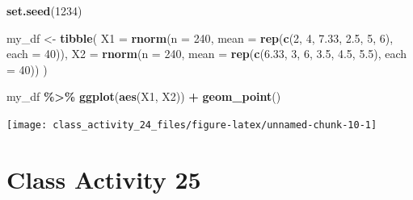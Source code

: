 \documentclass[
]{book}
\newenvironment{Shaded}{\begin{snugshade}}{\end{snugshade}}
\newcommand{\AttributeTok}[1]{\textcolor[rgb]{0.13,0.29,0.53}{#1}}
\newcommand{\DecValTok}[1]{\textcolor[rgb]{0.00,0.00,0.81}{#1}}
\newcommand{\FloatTok}[1]{\textcolor[rgb]{0.00,0.00,0.81}{#1}}
\newcommand{\FunctionTok}[1]{\textcolor[rgb]{0.13,0.29,0.53}{\textbf{#1}}}
\newcommand{\NormalTok}[1]{#1}
\newcommand{\OtherTok}[1]{\textcolor[rgb]{0.56,0.35,0.01}{#1}}
\newcommand{\SpecialCharTok}[1]{\textcolor[rgb]{0.81,0.36,0.00}{\textbf{#1}}}
\begin{document}
\begin{Shaded}
\begin{Highlighting}[]
\FunctionTok{set.seed}\NormalTok{(}\DecValTok{1234}\NormalTok{)}

\NormalTok{my\_df }\OtherTok{\textless{}{-}} \FunctionTok{tibble}\NormalTok{(}
  \AttributeTok{X1 =} \FunctionTok{rnorm}\NormalTok{(}\AttributeTok{n =} \DecValTok{240}\NormalTok{, }\AttributeTok{mean =} \FunctionTok{rep}\NormalTok{(}\FunctionTok{c}\NormalTok{(}\DecValTok{2}\NormalTok{, }\DecValTok{4}\NormalTok{, }\FloatTok{7.33}\NormalTok{, }\FloatTok{2.5}\NormalTok{, }\DecValTok{5}\NormalTok{, }\DecValTok{6}\NormalTok{), }\AttributeTok{each =} \DecValTok{40}\NormalTok{)),}
  \AttributeTok{X2 =} \FunctionTok{rnorm}\NormalTok{(}\AttributeTok{n =} \DecValTok{240}\NormalTok{, }\AttributeTok{mean =} \FunctionTok{rep}\NormalTok{(}\FunctionTok{c}\NormalTok{(}\FloatTok{6.33}\NormalTok{, }\DecValTok{3}\NormalTok{, }\DecValTok{6}\NormalTok{, }\FloatTok{3.5}\NormalTok{, }\FloatTok{4.5}\NormalTok{, }\FloatTok{5.5}\NormalTok{), }\AttributeTok{each =} \DecValTok{40}\NormalTok{))}
\NormalTok{)}

\NormalTok{my\_df }\SpecialCharTok{\%\textgreater{}\%}
  \FunctionTok{ggplot}\NormalTok{(}\FunctionTok{aes}\NormalTok{(X1, X2)) }\SpecialCharTok{+}
  \FunctionTok{geom\_point}\NormalTok{() }
\end{Highlighting}
\end{Shaded}

\texttt{[image: class\_activity\_24\_files/figure-latex/unnamed-chunk-10-1]}

\hypertarget{class-activity-25}{%
\chapter{Class Activity 25}\label{class-activity-25}}
\end{document}
